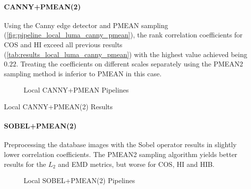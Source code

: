 \FloatBarrier
\paragraph{CANNY+PMEAN(2)}

Using the Canny edge detector and PMEAN sampling
(\autoref{fig:pipeline_local_luma_canny_pmean}), the rank correlation
coefficients for COS and HI exceed all previous results
(\autoref{tab:results_local_luma_canny_pmean}) with the highest value
achieved being $0.22$. Treating the coefficients on different scales separately
using the PMEAN2 sampling method is inferior to PMEAN in this case.

\begin{figure}[h]
    \centering
    
    \caption[Local CANNY+PMEAN Pipelines]{
        Local CANNY+PMEAN Pipelines
    }
    \label{fig:pipeline_local_luma_canny_pmean}
\end{figure}

\begin{table}[h]
    \centering
    \quad
    \caption[Local CANNY+PMEAN(2) Results]{
        Local CANNY+PMEAN(2) Results
    }
    \label{tab:results_local_luma_canny_pmean_all}
\end{table}

\FloatBarrier
\paragraph{SOBEL+PMEAN(2)}

Preprocessing the database images with the Sobel operator results in slightly
lower correlation coefficients. The PMEAN2 sampling algorithm yields better
results for the $L_2$ and EMD metrics, but worse for COS, HI and HIB.

\begin{figure}[h]
    \centering
    
    \caption[Local SOBEL+PMEAN(2) Pipelines]{
        Local SOBEL+PMEAN(2) Pipelines
    }
    \label{fig:pipeline_local_luma_sobel_pmean}
\end{figure}

